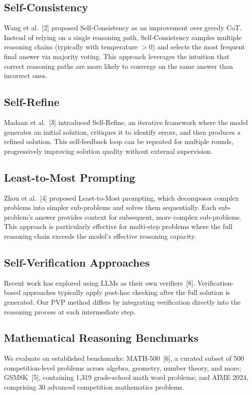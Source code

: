 \documentclass[conference]{IEEEtran}
\begin{document}
\subsection{Self-Consistency}
Wang et al.~[2] proposed Self-Consistency as an improvement over greedy CoT. Instead of relying on a single reasoning path, Self-Consistency samples multiple reasoning chains (typically with temperature $> 0$) and selects the most frequent final answer via majority voting. This approach leverages the intuition that correct reasoning paths are more likely to converge on the same answer than incorrect ones.

\subsection{Self-Refine}
Madaan et al.~[3] introduced Self-Refine, an iterative framework where the model generates an initial solution, critiques it to identify errors, and then produces a refined solution. This self-feedback loop can be repeated for multiple rounds, progressively improving solution quality without external supervision.

\subsection{Least-to-Most Prompting}
Zhou et al.~[4] proposed Least-to-Most prompting, which decomposes complex problems into simpler sub-problems and solves them sequentially. Each sub-problem's answer provides context for subsequent, more complex sub-problems. This approach is particularly effective for multi-step problems where the full reasoning chain exceeds the model's effective reasoning capacity.

\subsection{Self-Verification Approaches}
Recent work has explored using LLMs as their own verifiers~[8]. Verification-based approaches typically apply post-hoc checking after the full solution is generated. Our PVP method differs by integrating verification directly into the reasoning process at each intermediate step.

\subsection{Mathematical Reasoning Benchmarks}
We evaluate on established benchmarks: MATH-500~[6], a curated subset of 500 competition-level problems across algebra, geometry, number theory, and more; GSM8K~[5], containing 1,319 grade-school math word problems; and AIME 2024, comprising 30 advanced competition mathematics problems.
\end{document}
